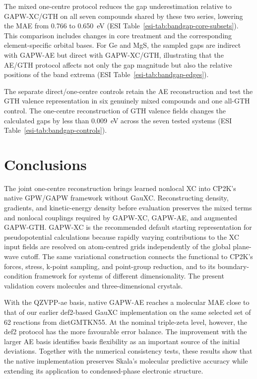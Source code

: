 \documentclass[10pt,a4paper,twocolumn]{article}
\begin{document}
The mixed one-centre protocol reduces the gap underestimation relative to GAPW-XC/GTH on all seven compounds shared by these two series, lowering the MAE from 0.766 to 0.650~eV (ESI Table~\ref{esi-tab:bandgap-core-subsets}). This comparison includes changes in core treatment and the corresponding element-specific orbital bases. For Ge and MgS, the sampled gaps are indirect with GAPW-AE but direct with GAPW-XC/GTH, illustrating that the AE/GTH protocol affects not only the gap magnitude but also the relative positions of the band extrema (ESI Table~\ref{esi-tab:bandgap-edges}).

The separate direct/one-centre controls retain the AE reconstruction and test the GTH valence representation in six genuinely mixed compounds and one all-GTH control. The one-centre reconstruction of GTH valence fields changes the calculated gaps by less than 0.009~eV across the seven tested systems (ESI Table~\ref{esi-tab:bandgap-controls}).

\section{Conclusions}

The joint one-centre reconstruction brings learned nonlocal XC into CP2K's native GPW/GAPW framework without GauXC. Reconstructing density, gradients, and kinetic-energy density before evaluation preserves the mixed terms and nonlocal couplings required by GAPW-XC, GAPW-AE, and augmented GAPW-GTH. GAPW-XC is the recommended default starting representation for pseudopotential calculations because rapidly varying contributions to the XC input fields are resolved on atom-centred grids independently of the global plane-wave cutoff. The same variational construction connects the functional to CP2K's forces, stress, k-point sampling, and point-group reduction, and to its boundary-condition framework for systems of different dimensionality. The present validation covers molecules and three-dimensional crystals.

With the QZVPP-ae basis, native GAPW-AE reaches a molecular MAE close to that of our earlier def2-based GauXC implementation on the same selected set of 62 reactions from dietGMTKN55. At the nominal triple-zeta level, however, the def2 protocol has the more favourable error balance. The improvement with the larger AE basis identifies basis flexibility as an important source of the initial deviations. Together with the numerical consistency tests, these results show that the native implementation preserves Skala's molecular predictive accuracy while extending its application to condensed-phase electronic structure.
\end{document}
